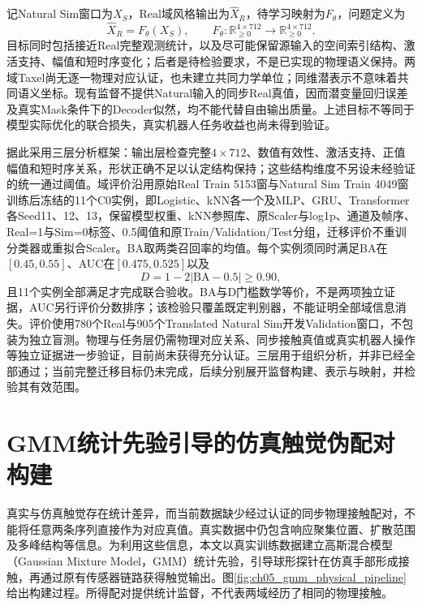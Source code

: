 记Natural Sim窗口为$X_S$，Real域风格输出为$\widehat X_R$，待学习映射为$F_\theta$，问题定义为
\begin{equation}
 \widehat X_R=F_\theta(X_S),\qquad
 F_\theta:\mathbb R_{\geq0}^{4\times712}
 \rightarrow\mathbb R_{\geq0}^{4\times712}.
 \label{eq:ch05_unpaired_mapping}
\end{equation}
目标同时包括接近Real完整观测统计，以及尽可能保留源输入的空间索引结构、激活支持、幅值和短时序变化；后者是待检验要求，不是已实现的物理语义保持。两域Taxel尚无逐一物理对应认证，也未建立共同力学单位；同维潜表示不意味着共同语义坐标。现有监督不提供Natural输入的同步Real真值，因而潜变量回归误差及真实Mask条件下的Decoder似然，均不能代替自由输出质量。上述目标不等同于模型实际优化的联合损失，真实机器人任务收益也尚未得到验证。

据此采用三层分析框架：输出层检查完整$4\times712$、数值有效性、激活支持、正值幅值和短时序关系，形状正确不足以认定结构保持；这些结构维度不另设未经验证的统一通过阈值。域评价沿用原始Real Train 5153窗与Natural Sim Train 4049窗训练后冻结的11个C0实例，即Logistic、kNN各一个及MLP、GRU、Transformer各Seed11、12、13，保留模型权重、kNN参照库、原Scaler与log1p、通道及帧序、Real=1与Sim=0标签、0.5阈值和原Train/Validation/Test分组，迁移评价不重训分类器或重拟合Scaler。BA取两类召回率的均值。每个实例须同时满足BA在$[0.45,0.55]$、AUC在$[0.475,0.525]$以及
\begin{equation}
 D=1-2|\mathrm{BA}-0.5|\geq0.90,
 \label{eq:ch05_domain_confusion_target}
\end{equation}
且11个实例全部满足才完成联合验收。BA与D门槛数学等价，不是两项独立证据，AUC另行评价分数排序；该检验只覆盖既定判别器，不能证明全部域信息消失。评价使用780个Real与905个Translated Natural Sim开发Validation窗口，不包装为独立盲测。物理与任务层仍需物理对应关系、同步接触真值或真实机器人操作等独立证据进一步验证，目前尚未获得充分认证。三层用于组织分析，并非已经全部通过；当前完整迁移目标仍未完成，后续分别展开监督构建、表示与映射，并检验其有效范围。



\section{GMM统计先验引导的仿真触觉伪配对构建}
\label{sec:ch05_gmm_pseudopairs}

真实与仿真触觉存在统计差异，而当前数据缺少经过认证的同步物理接触配对，不能将任意两条序列直接作为对应真值。真实数据中仍包含响应聚集位置、扩散范围及多峰结构等信息。为利用这些信息，本文以真实训练数据建立高斯混合模型（Gaussian Mixture Model，GMM）统计先验，引导球形探针在仿真手部形成接触，再通过原有传感器链路获得触觉输出。图\ref{fig:ch05_gmm_physical_pipeline}给出构建过程。所得配对提供统计监督，不代表两域经历了相同的物理接触。

